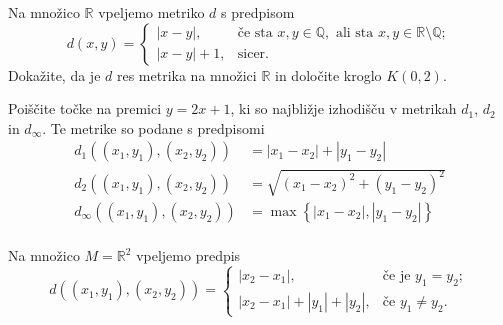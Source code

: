\documentclass[11pt,a4paper]{exam}
\renewcommand{\{}{\lbrace}
\renewcommand{\}}{\rbrace}
\begin{document}
\begin{questions}

		\question Na množico $\mathbb{R}$ vpeljemo metriko $d$ s predpisom 
		\[d(x,y) = 
			\begin{cases}
				|x-y|, & \text{če sta } x,y \in \mathbb{Q}, \text{ ali sta } x,y  \in \mathbb{R} \setminus \mathbb{Q}; \\ 
				|x-y|+1, & \text{sicer}.
			\end{cases}
		\]
		Dokažite, da je $d$ res metrika na množici $\mathbb{R}$ in določite kroglo $K(0,2)$.

		\question Poiščite točke na premici $y = 2x +1$, ki so najbližje izhodišču v metrikah $d_{1}$, $d_{2}$ in $d_{\infty}$.
		Te metrike so podane s predpisomi
		\begin{align*}
			d_{1}\left( (x_{1}, y_{1}), (x_{2}, y_{2}) \right) &= |x_{1} - x_{2}| + |y_{1} - y_{2}| \\
			d_{2}\left( (x_{1}, y_{1}), (x_{2}, y_{2}) \right) &= \sqrt{(x_{1} - x_{2})^{2} + (y_{1} - y_{2})^{2}} \\
			d_{\infty}\left( (x_{1}, y_{1}), (x_{2}, y_{2}) \right) &= \max\left\{ |x_{1} - x_{2}|, |y_{1} - y_{2}| \right\}\\
		\end{align*}

		\question Na množico $M = \mathbb{R}^{2}$ vpeljemo predpis 
		\[d\left( (x_{1}, y_{1}), (x_{2}, y_{2}) \right)=
		\begin{cases}
			|x_{2} - x_{1}|, &\text{če je } y_{1} = y_{2}; \\
			|x_{2} - x_{1}| + |y_{1}| + |y_{2}|, & \text{če } y_{1} \neq y_{2}.
		\end{cases}
		\]


\end{questions}
\end{document}
